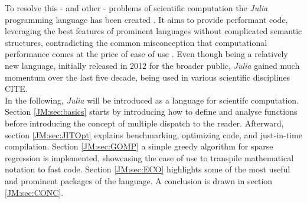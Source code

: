 To resolve this - and other - problems of scientific computation the \textit{Julia} programming language has been created \cite{JMBezansonEtAl2015}. It aims to provide performant code, leveraging the best features of 
prominent languages without complicated semantic structures, contradicting the common misconception that computational performance comes at the price of ease of use \cite{JMEdelman2019}. 
Even though being a relatively new language, initially released in 2012 for the broader public, \textit{Julia} gained much momentum over the last five decade, being used in various scientific disciplines CITE. \\

In the following, \textit{Julia} will be introduced as a language for scientifc computation. Section \ref{JM:sec:basics} starts by introducing how to define and analyse functions before introducing the concept of multiple dispatch to the reader.
Afterward, section \ref{JM:sec:JITOpt} explains benchmarking, optimizing code, and just-in-time compilation. Section \ref{JM:sec:GOMP} a simple greedy algorithm for sparse regression is implemented, showcasing the ease of use to transpile mathematical notation to fast code.
Section \ref{JM:sec:ECO} highlights some of the most useful and prominent packages of the language.
A conclusion is drawn in section \ref{JM:sec:CONC}.

\newpage
